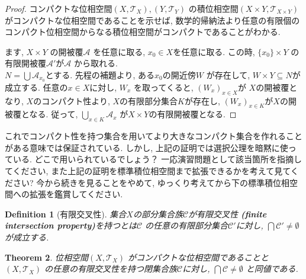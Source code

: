 \documentclass[dvipdfmx]{jbook}
\newtheorem{theorem}{Theorem}[section]
\newtheorem{definition}[theorem]{Definition}
\theoremstyle{remark}
\theoremstyle{plain}
\begin{document}
\begin{proof}
	コンパクトな位相空間$\left( X , \mathcal{T}_{X} \right),\left( Y , \mathcal{T}_{Y} \right)$
	の積位相空間$\left( X\times Y , \mathcal{T}_{X\times Y} \right)$がコンパクトな位相空間であることを示せば, 数学的帰納法より任意の有限個のコンパクト位相空間からなる積位相空間がコンパクトであることがわかる.

	ます, $X \times Y$ の開被覆$\mathcal{A}$ を任意に取る, $x_0 \in X$を任意に取る.
	この時, $\{x_0\} \times Y$ の有限開被覆$\mathcal{A}'$が$\mathcal{A}$ から取れる. \\
	$N = \bigcup \mathcal{A}_{x_0}$とする. 先程の補題より, ある$x_0$の開近傍$W$ が存在して, $W \times Y \subseteq N$が成立する.
	任意の$x \in X$に対し, $W_{x}$ を取ってくると, $\left( W_x \right)_{x \in X}$が $X$の開被覆となり,
	 $X$のコンパクト性より,  $X$の有限部分集合$K$が存在し,  $\left( W_x \right) _{x \in K}$が$X$の開被覆となる.
	 従って, $\bigcup_{x \in K} \mathcal{A}_x $ が$X \times Y$の有限開被覆となる.
\end{proof}

これでコンパクト性を持つ集合を用いてより大きなコンパクト集合を作れること
がある意味では保証されている. しかし, 上記の証明では選択公理を暗黙に使っている. どこで用いられているでしょう？
一応演習問題として該当箇所を指摘してください, また上記の証明を標準積位相空間まで拡張できるかを考えて見てください? 今から続きを見ることをやめて, ゆっくり考えてから下の標準積位相空間への拡張を鑑賞してください.

\begin{definition}[有限交叉性]
	集合$X$の部分集合族$\mathcal{C}$が有限交叉性 
	\textbf{(finite intersection property)}を持つとは$\mathcal{C}$ 
	の任意の有限部分集合$\mathcal{C}'$に対し, $\bigcap \mathcal{C}' \neq \emptyset$ が成立する.
\end{definition}

\begin{theorem}
	位相空間$\left( X , \mathcal{T}_{X} \right)$ がコンパクトな位相空間であることと$\left( X , \mathcal{T}_{X} \right)$ の任意の有限交叉性を持つ閉集合族$\mathcal{C}$に対し, $\bigcap \mathcal{C} \neq \emptyset $ と同値である.
\end{theorem}
\end{document}
